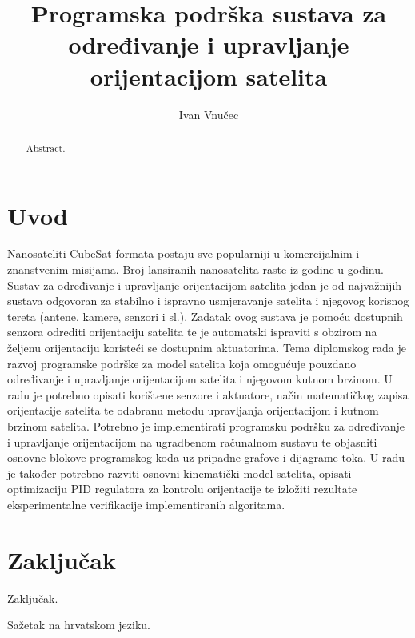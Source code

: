 \documentclass[times, utf8, diplomski]{templates/fer}
\begin{document}

\title{Programska podrška sustava za određivanje i upravljanje orijentacijom satelita}

\author{Ivan Vnučec}

\maketitle

\izvornik


\tableofcontents

\chapter{Uvod}
Nanosateliti CubeSat formata postaju sve popularniji u komercijalnim i znanstvenim misijama. Broj lansiranih nanosatelita raste iz godine u godinu. Sustav za određivanje i upravljanje orijentacijom satelita jedan je od najvažnijih sustava odgovoran za stabilno i ispravno usmjeravanje satelita i njegovog korisnog tereta (antene, kamere, senzori i sl.). Zadatak ovog sustava je pomoću dostupnih senzora odrediti orijentaciju satelita te je automatski ispraviti s obzirom na željenu orijentaciju koristeći se dostupnim aktuatorima. Tema diplomskog rada je razvoj programske podrške za model satelita koja omogućuje pouzdano određivanje i upravljanje orijentacijom satelita i njegovom kutnom brzinom. U radu je potrebno opisati korištene senzore i aktuatore, način matematičkog zapisa orijentacije satelita te odabranu metodu upravljanja orijentacijom i kutnom brzinom satelita. Potrebno je implementirati programsku podršku za određivanje i upravljanje orijentacijom na ugradbenom računalnom sustavu te objasniti osnovne blokove programskog koda uz pripadne grafove i dijagrame toka. U radu je također potrebno razviti osnovni kinematički model satelita, opisati optimizaciju PID regulatora za kontrolu orijentacije te izložiti rezultate eksperimentalne verifikacije implementiranih algoritama. 

\chapter{Zaključak}
Zaključak.




\begin{sazetak}
Sažetak na hrvatskom jeziku.

\end{sazetak}

\begin{abstract}
Abstract.

\end{abstract}
\end{document}
